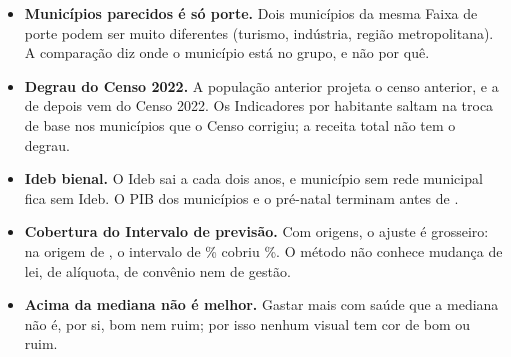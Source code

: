 \documentclass[11pt,a4paper]{article}
\begin{document}
\begin{itemize}[leftmargin=*]
  \item \textbf{Municípios parecidos é só porte.} Dois municípios da mesma
    Faixa de porte podem ser muito diferentes (turismo, indústria, região
    metropolitana). A comparação diz onde o município está no grupo, e não
    por quê.
  \item \textbf{Degrau do Censo 2022.} A população anterior projeta o
    censo anterior, e a de depois vem do Censo 2022. Os Indicadores por
    habitante saltam na troca de base nos municípios que o Censo corrigiu;
    a receita total não tem o degrau.
  \item \textbf{Ideb bienal.} O Ideb sai a cada dois anos, e município sem
    rede municipal fica sem Ideb. O PIB dos municípios e o pré-natal
    terminam antes de \NumAnoFinal.
  \item \textbf{Cobertura do Intervalo de previsão.} Com \NumOrigensTeste{}
    origens, o ajuste é grosseiro: na origem de \NumCobOitentaPiorOrigem,
    o intervalo de \NumNivelMenor\% cobriu \NumCobOitentaPior\%. O método
    não conhece mudança de lei, de alíquota, de convênio nem de gestão.
  \item \textbf{Acima da mediana não é melhor.} Gastar mais com saúde que
    a mediana não é, por si, bom nem ruim; por isso nenhum visual tem cor
    de bom ou ruim.
\end{itemize}
\end{document}

